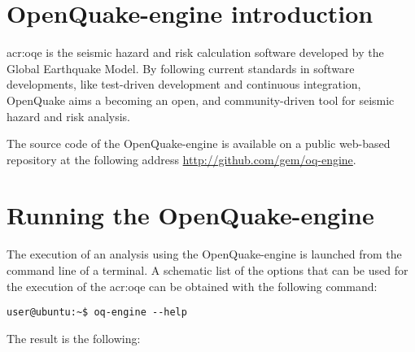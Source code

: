 \section{OpenQuake-engine introduction}
\gls{acr:oqe} is the seismic hazard and risk calculation software developed by
the Global Earthquake Model. By following current standards in software developments, like test-driven development and continuous
integration, OpenQuake aims a becoming an open, and community-driven tool for
seismic hazard and risk analysis.

The source code of the OpenQuake-engine is available on a public web-based repository
at the following address \href{http://github.com/gem/oq-engine}{http://github.com/gem/oq-engine}.
\section{Running the OpenQuake-engine}
\label{sec:intro}
The execution of an analysis using the OpenQuake-engine is launched from 
the command line of a terminal. A schematic list of the options that 
can be used for the execution of the \gls{acr:oqe} can be obtained 
with the following command:
\begin{Verbatim}[frame=single, commandchars=\\\{\}, fontsize=\small]
user@ubuntu:~$ oq-engine --help
\end{Verbatim}
The result is the following:
